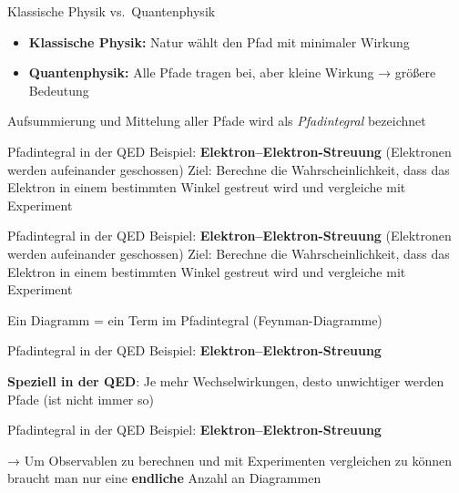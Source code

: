 \documentclass[
  ignorenonframetext,
  ngerman,
]{beamer}
\providecommand{\tightlist}{%
  \setlength{\itemsep}{0pt}\setlength{\parskip}{0pt}}
\begin{document}
\begin{frame}{Klassische Physik vs.~Quantenphysik}
\label{klassische-physik-vs.-quantenphysik-1}
\begin{itemize}
\tightlist
\item
  {\textbf{Klassische Physik:}} Natur wählt den Pfad mit minimaler
  Wirkung
\item
  {\textbf{Quantenphysik:}} Alle Pfade tragen bei, aber kleine Wirkung →
  größere Bedeutung
\end{itemize}

\pause

Aufsummierung und Mittelung aller Pfade wird als \emph{Pfadintegral}
bezeichnet

\end{frame}

\begin{frame}{Pfadintegral in der QED}
\label{pfadintegral-in-der-qed}
Beispiel: \textbf{Elektron--Elektron-Streuung} (Elektronen werden
aufeinander geschossen) Ziel: Berechne die Wahrscheinlichkeit, dass das
Elektron in einem bestimmten Winkel gestreut wird und vergleiche mit
Experiment
\end{frame}

\begin{frame}{Pfadintegral in der QED}
\label{pfadintegral-in-der-qed-1}
Beispiel: \textbf{Elektron--Elektron-Streuung} (Elektronen werden
aufeinander geschossen) Ziel: Berechne die Wahrscheinlichkeit, dass das
Elektron in einem bestimmten Winkel gestreut wird und vergleiche mit
Experiment

Ein Diagramm = ein Term im Pfadintegral (Feynman-Diagramme)
\end{frame}

\begin{frame}{Pfadintegral in der QED}
\label{pfadintegral-in-der-qed-2}
Beispiel: \textbf{Elektron--Elektron-Streuung}

\pause

\textbf{Speziell in der QED}: Je mehr Wechselwirkungen, desto
unwichtiger werden Pfade (ist nicht immer so)
\end{frame}

\begin{frame}{Pfadintegral in der QED}
\label{pfadintegral-in-der-qed-3}
Beispiel: \textbf{Elektron--Elektron-Streuung}

→ Um Observablen zu berechnen und mit Experimenten vergleichen zu können
braucht man nur eine \textbf{endliche} Anzahl an Diagrammen
\end{frame}
\end{document}
